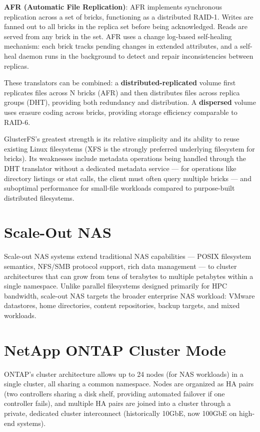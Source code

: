 \textbf{AFR (Automatic File Replication)}: AFR implements synchronous replication across a set of bricks, functioning as a distributed RAID-1. Writes are fanned out to all bricks in the replica set before being acknowledged. Reads are served from any brick in the set. AFR uses a change log-based self-healing mechanism: each brick tracks pending changes in extended attributes, and a self-heal daemon runs in the background to detect and repair inconsistencies between replicas.

These translators can be combined: a \textbf{distributed-replicated} volume first replicates files across N bricks (AFR) and then distributes files across replica groups (DHT), providing both redundancy and distribution. A \textbf{dispersed} volume uses erasure coding across bricks, providing storage efficiency comparable to RAID-6.

GlusterFS's greatest strength is its relative simplicity and its ability to reuse existing Linux filesystems (XFS is the strongly preferred underlying filesystem for bricks). Its weaknesses include metadata operations being handled through the DHT translator without a dedicated metadata service --- for operations like directory listings or stat calls, the client must often query multiple bricks --- and suboptimal performance for small-file workloads compared to purpose-built distributed filesystems.

\section{Scale-Out NAS}
Scale-out NAS systems extend traditional NAS capabilities --- POSIX filesystem semantics, NFS/SMB protocol support, rich data management --- to cluster architectures that can grow from tens of terabytes to multiple petabytes within a single namespace. Unlike parallel filesystems designed primarily for HPC bandwidth, scale-out NAS targets the broader enterprise NAS workload: VMware datastores, home directories, content repositories, backup targets, and mixed workloads.

\section{NetApp ONTAP Cluster Mode}
ONTAP's cluster architecture allows up to 24 nodes (for NAS workloads) in a single cluster, all sharing a common namespace. Nodes are organized as HA pairs (two controllers sharing a disk shelf, providing automated failover if one controller fails), and multiple HA pairs are joined into a cluster through a private, dedicated cluster interconnect (historically 10GbE, now 100GbE on high-end systems).

